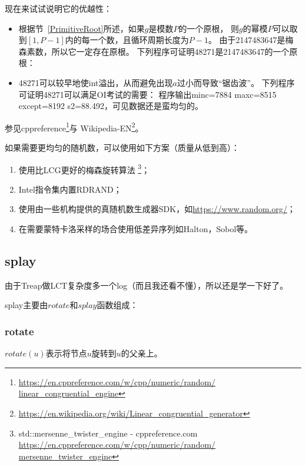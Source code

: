 现在来试试说明它的优越性：

\begin{itemize}
    \item 根据节~\ref{PrimitiveRoot}所述，如果$g$是模数$P$的一个原根，
    则$g$的幂模$P$可以取到$[1,P-1]$内的每一个数，且循环周期长度为$P-1$。
    由于2147483647是梅森素数，所以它一定存在原根。
    下列程序可证明48271是2147483647的一个原根：
    
    \item 48271可以较早地使int溢出，从而避免出现$a$过小而导致``锯齿波''。
    下列程序可证明48271可以满足OI考试的需要：
    程序输出minc=7884 maxc=8515 except=8192 s2=88.492，可见数据还是蛮均匀的。
\end{itemize}

参见cppreference\footnote{
    \url{https://en.cppreference.com/w/cpp/numeric/random/
    linear\_congruential\_engine}}与
    Wikipedia-EN\footnote{
    \url{https://en.wikipedia.org/wiki/Linear\_congruential\_generator}}。

如果需要更均匀的随机数，可以使用如下方案（质量从低到高）：
\begin{enumerate}
    \item 使用比LCG更好的梅森旋转算法
    \footnote{std::mersenne\_twister\_engine - cppreference.com
    \url{https://en.cppreference.com/w/cpp/numeric/random/
    mersenne\_twister\_engine}}；
    \item Intel指令集内置RDRAND；
    \item 使用由一些机构提供的真随机数生成器SDK，如\url{https://www.random.org/}；
    \item 在需要蒙特卡洛采样的场合使用低差异序列如Halton，Sobol等。
\end{enumerate}

\subsection{splay}\label{splay}

由于Treap做LCT复杂度多一个log（而且我还看不懂），所以还是学一下好了。

splay主要由$rotate$和$splay$函数组成：

\subsubsection{rotate}

$rotate(u)$表示将节点$u$旋转到$u$的父亲上。



